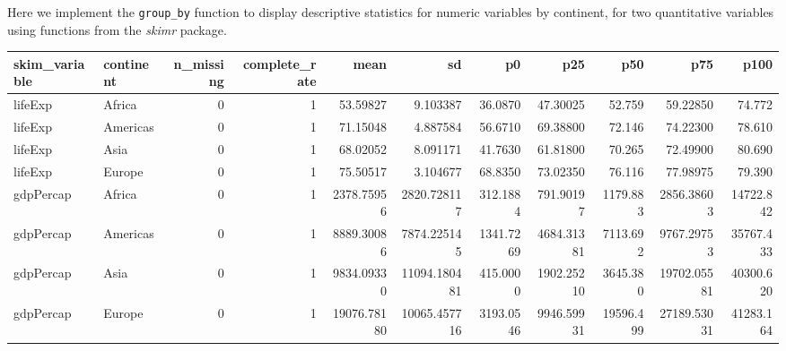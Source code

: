 \documentclass[
]{book}
\newenvironment{Shaded}{\begin{snugshade}}{\end{snugshade}}
\newcommand{\DecValTok}[1]{\textcolor[rgb]{0.00,0.00,0.81}{#1}}
\newcommand{\KeywordTok}[1]{\textcolor[rgb]{0.13,0.29,0.53}{\textbf{#1}}}
\newcommand{\NormalTok}[1]{#1}
\newcommand{\OperatorTok}[1]{\textcolor[rgb]{0.81,0.36,0.00}{\textbf{#1}}}
\newcommand{\StringTok}[1]{\textcolor[rgb]{0.31,0.60,0.02}{#1}}
\begin{document}
Here we implement the \texttt{group\_by} function to display descriptive statistics for numeric variables by continent, for two quantitative variables using functions from the \emph{skimr} package.

\begin{Shaded}
\end{Shaded}

\begin{tabular}{l|l|r|r|r|r|r|r|r|r|r}
\hline
skim\_variable & continent & n\_missing & complete\_rate & mean & sd & p0 & p25 & p50 & p75 & p100\\
\hline
lifeExp & Africa & 0 & 1 & 53.59827 & 9.103387 & 36.0870 & 47.30025 & 52.759 & 59.22850 & 74.772\\
\hline
lifeExp & Americas & 0 & 1 & 71.15048 & 4.887584 & 56.6710 & 69.38800 & 72.146 & 74.22300 & 78.610\\
\hline
lifeExp & Asia & 0 & 1 & 68.02052 & 8.091171 & 41.7630 & 61.81800 & 70.265 & 72.49900 & 80.690\\
\hline
lifeExp & Europe & 0 & 1 & 75.50517 & 3.104677 & 68.8350 & 73.02350 & 76.116 & 77.98975 & 79.390\\
\hline
gdpPercap & Africa & 0 & 1 & 2378.75956 & 2820.728117 & 312.1884 & 791.90197 & 1179.883 & 2856.38603 & 14722.842\\
\hline
gdpPercap & Americas & 0 & 1 & 8889.30086 & 7874.225145 & 1341.7269 & 4684.31381 & 7113.692 & 9767.29753 & 35767.433\\
\hline
gdpPercap & Asia & 0 & 1 & 9834.09330 & 11094.180481 & 415.0000 & 1902.25210 & 3645.380 & 19702.05581 & 40300.620\\
\hline
gdpPercap & Europe & 0 & 1 & 19076.78180 & 10065.457716 & 3193.0546 & 9946.59931 & 19596.499 & 27189.53031 & 41283.164\\
\hline
\end{tabular}
\end{document}
